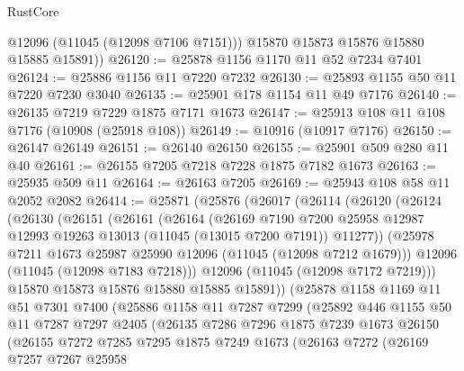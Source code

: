 \begin{lexlean}{RustCore}
\begin{coremodule}
          @12096
          (@11045 (@12098 @7106 @7151)))
        @15870
        @15873
        @15876
        @15880
        @15885
        @15891))
@26120 := @25878 @1156 @1170 @11 @52 @7234 @7401
@26124 := @25886 @1156 @11 @7220 @7232
@26130 := @25893 @1155 @50 @11 @7220 @7230 @3040
@26135 := @25901 @178 @1154 @11 @49 @7176
@26140 := @26135 @7219 @7229 @1875 @7171 @1673
@26147 := @25913 @108 @11 @108 @7176 (@10908 (@25918 @108))
@26149 := @10916 (@10917 @7176)
@26150 := @26147 @26149
@26151 := @26140 @26150
@26155 := @25901 @509 @280 @11 @40
@26161 := @26155 @7205 @7218 @7228 @1875 @7182 @1673
@26163 := @25935 @509 @11
@26164 := @26163 @7205
@26169 := @25943 @108 @58 @11 @2052 @2082
@26414 := @25871
    (@25876
      (@26017
        (@26114
          (@26120
            (@26124
              (@26130
                (@26151
                  (@26161
                    (@26164
                      (@26169
                        @7190
                        @7200
                        @25958
                        @12987
                        @12993
                        @19263
                        @13013
                        (@11045 (@13015 @7200 @7191))
                        @11277))
                    (@25978 @7211 @1673 @25987 @25990 @12096 (@11045 (@12098 @7212 @1679)))
                    @12096
                    (@11045 (@12098 @7183 @7218)))
                  @12096
                  (@11045 (@12098 @7172 @7219)))
                @15870
                @15873
                @15876
                @15880
                @15885
                @15891))
            (@25878
              @1158
              @1169
              @11
              @51
              @7301
              @7400
              (@25886
                @1158
                @11
                @7287
                @7299
                (@25892
                  @446
                  @1155
                  @50
                  @11
                  @7287
                  @7297
                  @2405
                  (@26135
                    @7286
                    @7296
                    @1875
                    @7239
                    @1673
                    @26150
                    (@26155
                      @7272
                      @7285
                      @7295
                      @1875
                      @7249
                      @1673
                      (@26163
                        @7272
                        (@26169
                          @7257
                          @7267
                          @25958

\end{coremodule}
\end{lexlean}
